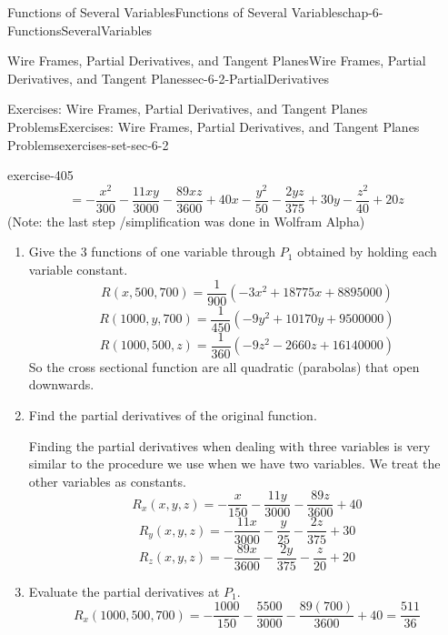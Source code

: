 \documentclass[oneside,10pt,]{book}
\numberwithin{equation}{section}
\begin{document}
\begin{chapterptx}{Functions of Several Variables}{}{Functions of Several Variables}{}{}{chap-6-FunctionsSeveralVariables}
\begin{sectionptx}{Wire Frames, Partial Derivatives, and Tangent Planes}{}{Wire Frames, Partial Derivatives, and Tangent Planes}{}{}{sec-6-2-PartialDerivatives}
\begin{exercises-subsection-numberless}{Exercises: Wire Frames, Partial Derivatives, and Tangent Planes Problems}{}{Exercises: Wire Frames, Partial Derivatives, and Tangent Planes Problems}{}{}{exercises-set-sec-6-2}
\begin{exercisegroup}
\begin{divisionexerciseeg}{11}{}{}{exercise-405}
\begin{equation*}
\end{equation*}
%
\begin{equation*}
=  -\frac{x^2}{300}-\frac{11 x y}{3000}-\frac{89 x z}{3600}+40 x-\frac{y^2}{50}-\frac{2 y z}{375}+30 y-\frac{z^2}{40}+20 z
\end{equation*}
\hypertarget{p-2315}{}%
(Note: the last step \slash{}simplification was done in Wolfram Alpha)%
\leavevmode%
\begin{enumerate}[label=(\alph*)]
\item\hypertarget{li-647}{}\hypertarget{p-2316}{}%
Give the 3 functions of one variable through \(P_1\) obtained by holding each variable constant.%
%
\begin{equation*}
R(x,500,700)= \frac{1}{900}  (-3 x^2+18775 x+8895000)
\end{equation*}
%
\begin{equation*}
R(1000,y,700)= \frac{1}{450}  (-9 y^2+10170 y+9500000)
\end{equation*}
%
\begin{equation*}
R(1000,500,z)= \frac{1}{360}  (-9 z^2-2660 z+16140000)
\end{equation*}
\hypertarget{p-2317}{}%
So the cross sectional function are all quadratic (parabolas) that open downwards.%
\item\hypertarget{li-648}{}\hypertarget{p-2318}{}%
Find the partial derivatives of the original function.%
\par
\hypertarget{p-2319}{}%
Finding the partial derivatives when dealing with three variables is very similar to the procedure we use when we have two variables. We treat the other variables as constants.%
%
\begin{equation*}
R_x  (x,y,z)=  -\frac{x}{150}-\frac{11  y}{3000}-\frac{89  z}{3600}+40 
\end{equation*}
%
\begin{equation*}
R_y  (x,y,z)=  -\frac{11 x }{3000}-\frac{y}{25}-\frac{2  z}{375}+30 
\end{equation*}
%
\begin{equation*}
R_z  (x,y,z)=  -\frac{89 x }{3600}-\frac{2 y}{375}-\frac{z}{20}+20 
\end{equation*}
\item\hypertarget{li-649}{}\hypertarget{p-2320}{}%
Evaluate the partial derivatives at \(P_1\).%
%
\begin{equation*}
R_x  (1000,500,700)=  -\frac{1000}{150}-\frac{5500}{3000}-\frac{89  (700)}{3600}+40=\frac{511}{36}
\end{equation*}
%
\begin{equation*}

\end{equation*}
\end{enumerate}
\end{divisionexerciseeg}
\end{exercisegroup}
\end{exercises-subsection-numberless}
\end{sectionptx}
\end{chapterptx}
\end{document}
